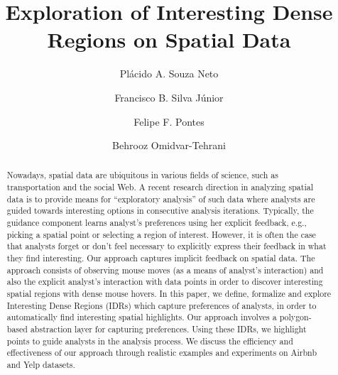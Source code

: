 \documentclass[sigconf,edbt]{acmart-edbt2019}
\begin{document}
\title{Exploration of Interesting Dense Regions on Spatial Data}
  

\author{Pl\'acido A. Souza Neto}

\author{Francisco B. Silva J\'unior}

\author{Felipe F. Pontes}


 \author{Behrooz Omidvar-Tehrani}



\renewcommand{\shortauthors}{}


\begin{abstract}
Nowadays, spatial data are ubiquitous in various fields of science, such as transportation and the social Web. A recent research direction in analyzing spatial data is to provide means for ``exploratory analysis'' of such data where analysts are guided towards interesting options in consecutive analysis iterations. Typically, the guidance component learns analyst's preferences using her explicit feedback, e.g., picking a spatial point or selecting a region of interest. However, it is often the case that analysts forget or don't feel necessary to explicitly express their feedback in what they find interesting. Our approach captures implicit feedback on spatial data. The approach consists of observing mouse moves (as a means of analyst's interaction) and also the explicit analyst's interaction with data points in order to discover interesting spatial regions with dense mouse hovers. In this paper, we define, formalize and explore Interesting Dense Regions (IDRs) which capture preferences of analysts, in order to automatically find interesting spatial highlights. Our approach involves a polygon-based abstraction layer for capturing preferences. Using these IDRs, we highlight points to guide analysts in the analysis process. We discuss the efficiency and effectiveness of our approach through realistic examples and experiments on \textsf{Airbnb} and \textsf{Yelp} datasets.
\end{abstract}
\end{document}
